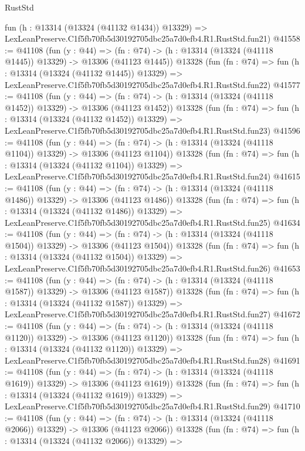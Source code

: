 \begin{lexlean}{RustStd}
\begin{coremodule}
    fun (h : @13314 (@13324 (@41132 @1434)) @13329) =>
    LexLeanPreserve.C1f5fb70fb5d30192705dbc25a7d0efb4.R1.RustStd.fun21)
@41558 := @41108
    (fun (y : @44) =>
    (fn : @74) -> (h : @13314 (@13324 (@41118 @1445)) @13329) -> @13306 (@41123 @1445))
    @13328
    (fun (fn : @74) =>
    fun (h : @13314 (@13324 (@41132 @1445)) @13329) =>
    LexLeanPreserve.C1f5fb70fb5d30192705dbc25a7d0efb4.R1.RustStd.fun22)
@41577 := @41108
    (fun (y : @44) =>
    (fn : @74) -> (h : @13314 (@13324 (@41118 @1452)) @13329) -> @13306 (@41123 @1452))
    @13328
    (fun (fn : @74) =>
    fun (h : @13314 (@13324 (@41132 @1452)) @13329) =>
    LexLeanPreserve.C1f5fb70fb5d30192705dbc25a7d0efb4.R1.RustStd.fun23)
@41596 := @41108
    (fun (y : @44) =>
    (fn : @74) -> (h : @13314 (@13324 (@41118 @1104)) @13329) -> @13306 (@41123 @1104))
    @13328
    (fun (fn : @74) =>
    fun (h : @13314 (@13324 (@41132 @1104)) @13329) =>
    LexLeanPreserve.C1f5fb70fb5d30192705dbc25a7d0efb4.R1.RustStd.fun24)
@41615 := @41108
    (fun (y : @44) =>
    (fn : @74) -> (h : @13314 (@13324 (@41118 @1486)) @13329) -> @13306 (@41123 @1486))
    @13328
    (fun (fn : @74) =>
    fun (h : @13314 (@13324 (@41132 @1486)) @13329) =>
    LexLeanPreserve.C1f5fb70fb5d30192705dbc25a7d0efb4.R1.RustStd.fun25)
@41634 := @41108
    (fun (y : @44) =>
    (fn : @74) -> (h : @13314 (@13324 (@41118 @1504)) @13329) -> @13306 (@41123 @1504))
    @13328
    (fun (fn : @74) =>
    fun (h : @13314 (@13324 (@41132 @1504)) @13329) =>
    LexLeanPreserve.C1f5fb70fb5d30192705dbc25a7d0efb4.R1.RustStd.fun26)
@41653 := @41108
    (fun (y : @44) =>
    (fn : @74) -> (h : @13314 (@13324 (@41118 @1587)) @13329) -> @13306 (@41123 @1587))
    @13328
    (fun (fn : @74) =>
    fun (h : @13314 (@13324 (@41132 @1587)) @13329) =>
    LexLeanPreserve.C1f5fb70fb5d30192705dbc25a7d0efb4.R1.RustStd.fun27)
@41672 := @41108
    (fun (y : @44) =>
    (fn : @74) -> (h : @13314 (@13324 (@41118 @1120)) @13329) -> @13306 (@41123 @1120))
    @13328
    (fun (fn : @74) =>
    fun (h : @13314 (@13324 (@41132 @1120)) @13329) =>
    LexLeanPreserve.C1f5fb70fb5d30192705dbc25a7d0efb4.R1.RustStd.fun28)
@41691 := @41108
    (fun (y : @44) =>
    (fn : @74) -> (h : @13314 (@13324 (@41118 @1619)) @13329) -> @13306 (@41123 @1619))
    @13328
    (fun (fn : @74) =>
    fun (h : @13314 (@13324 (@41132 @1619)) @13329) =>
    LexLeanPreserve.C1f5fb70fb5d30192705dbc25a7d0efb4.R1.RustStd.fun29)
@41710 := @41108
    (fun (y : @44) =>
    (fn : @74) -> (h : @13314 (@13324 (@41118 @2066)) @13329) -> @13306 (@41123 @2066))
    @13328
    (fun (fn : @74) =>
    fun (h : @13314 (@13324 (@41132 @2066)) @13329) =>

\end{coremodule}
\end{lexlean}
